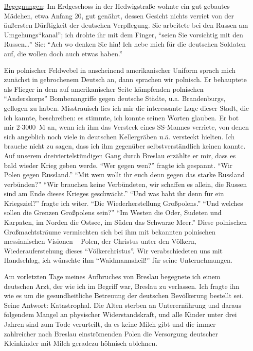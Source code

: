 \documentclass[a5paper,pagesize,10pt,twoside=true]{scrbook}
\renewcommand{\marginpar}[2][]{}
\begin{document}
\underline{Begegnungen}: Im Erdgeschoss in der Hedwigstraße wohnte ein gut gebautes Mädchen, etwa Anfang 20, gut genährt, dessen Gesicht nichts verriet von der äußersten Dürftigkeit der deutschen Verpflegung. Sie arbeitete bei den Russen am Umgehungs\enquote{kanal}; ich drohte ihr mit dem Finger, \enquote{seien Sie vorsichtig mit den Russen\dots} Sie: \enquote{Ach wo denken Sie hin! Ich hebe mich für die deutschen Soldaten auf, die wollen doch auch etwas haben.}

Ein polnischer Feldwebel in anscheinend amerikanischer Uniform sprach mich zunächst in gebrochenem Deutsch an, dann sprachen wir polnisch. Er behauptete als Flieger in dem auf amerikanischer Seite kämpfenden polnischen \enquote{Anderskorps} Bombenangriffe gegen deutsche Städte, u.a. Brandenburgs, geflogen zu haben. Misstrauisch lies ich mir die interessante Lage \marginpar{98} dieser Stadt, die ich kannte, beschreiben: es stimmte, ich konnte seinen Worten glauben. Er bot mir 2-3000~M an, wenn ich ihm das Versteck eines SS-Mannes verriete, von denen sich angeblich noch viele in deutschen Kellergräben u.ä. versteckt hielten. Ich brauche nicht zu sagen, dass ich ihm gegenüber selbstverständlich keinen kannte. Auf unserem dreiviertelstündigen Gang durch Breslau erzählte er mir, dass es bald wieder Krieg geben werde. \enquote{Wer gegen wen?} fragte ich gespannt. \enquote{Wir Polen gegen Russland.} \enquote{Mit wem wollt ihr euch denn gegen das starke Russland verbünden?} \enquote{Wir brauchen keine Verbündeten, wir schaffen es allein, die Russen sind am Ende dieses Krieges geschwächt.} \enquote{Und was habt ihr denn für ein Kriegsziel?} fragte ich witer. \enquote{Die Wiederherstellung Großpolens.} \enquote{Und welches sollen die Grenzen Großpolens sein?} \enquote{Im Westen die Oder, Sudeten und Karpaten, im Norden die Ostsee, im Süden das Schwarze Meer.} Diese polnischen Großmachtsträume vermischten sich bei ihm mit bekannten polnischen messianischen Visionen -- Polen, der Christus unter den Völkern, Wiederauferstehung dieses \enquote{Völkerchristus}. Wir verabschiedeten \marginpar{99} uns mit Handschlag, ich wünschte ihm \enquote{Waidmannsheil!} für seine Unternehmungen.

Am vorletzten Tage meines Aufbruches von Breslau begegnete ich einem deutschen Arzt, der wie ich im Begriff war, Breslau zu verlassen. Ich fragte ihn wie es um die gesundheitliche Betreuung der deutschen Bevölkerung bestellt sei. Seine Antwort: Katastrophal. Die Alten sterben an Unterernährung und daraus folgendem Mangel an physischer Widerstandskraft, und alle Kinder unter drei Jahren sind zum Tode verurteilt, da es keine Milch gibt und die immer zahlreicher nach Breslau einströmenden Polen die Versorgung deutscher Kleinkinder mit Milch geradezu höhnisch ablehnen.
\end{document}
